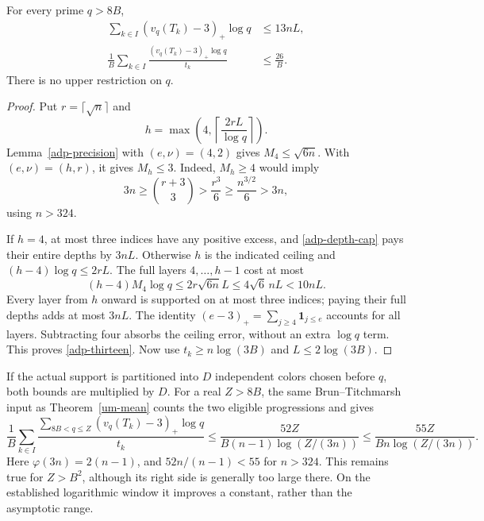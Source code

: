 \begin{theorem}\label{adp-prime}
For every prime \(q>8B\),
\begin{align}
 \sum_{k\in I}(v_q(T_k)-3)_+\log q&\leq13nL,
                    \label{adp-thirteen}\\
 \frac1B\sum_{k\in I}\frac{(v_q(T_k)-3)_+\log q}{t_k}
       &\leq\frac{26}{B}. \label{adp-twentysix}
\end{align}
There is no upper restriction on \(q\).
\end{theorem}
\begin{proof}
Put \(r=\lceil\sqrt n\rceil\) and
\[
 h=\max\left(4,\left\lceil\frac{2rL}{\log q}\right\rceil\right).
\]
Lemma~\ref{adp-precision} with \((e,\nu)=(4,2)\) gives
\(M_4\leq\sqrt{6n}\). With \((e,\nu)=(h,r)\), it gives \(M_h\leq3\).
Indeed, \(M_h\geq4\) would imply
\[
 3n\geq\binom{r+3}{3}>\frac{r^3}{6}
       \geq\frac{n^{3/2}}6>3n,
\]
using \(n>324\).

If \(h=4\), at most three indices have any positive excess, and
\eqref{adp-depth-cap} pays their entire depths by \(3nL\).
Otherwise \(h\) is the indicated ceiling and
\((h-4)\log q\leq2rL\). The full layers \(4,\ldots,h-1\) cost at most
\[
 (h-4)M_4\log q\leq2r\sqrt{6n}L
       \leq4\sqrt6\,nL<10nL.
\]
Every layer from \(h\) onward is supported on at most three indices;
paying their full depths adds at most \(3nL\). The identity
\((e-3)_+=\sum_{j\geq4}\mathbf1_{j\leq e}\) accounts for all layers.
Subtracting four absorbs the ceiling error, without an extra
\(\log q\) term. This proves \eqref{adp-thirteen}.
Now use \(t_k\geq n\log(3B)\) and \(L\leq2\log(3B)\).
\end{proof}

If the actual support is partitioned into \(D\) independent colors
chosen before \(q\), both bounds are multiplied by \(D\).
For a real \(Z>8B\), the same Brun--Titchmarsh input as
Theorem~\ref{um-mean} counts the two eligible progressions and gives
\begin{equation}\label{adp-window}
 \frac1B\sum_{k\in I}
  \frac{\sum_{8B<q\leq Z}(v_q(T_k)-3)_+\log q}{t_k}
 \leq\frac{52Z}{B(n-1)\log(Z/(3n))}
 \leq\frac{55Z}{Bn\log(Z/(3n))}.
\end{equation}
Here \(\varphi(3n)=2(n-1)\), and \(52n/(n-1)<55\) for \(n>324\).
This remains true for \(Z>B^2\), although its right side is generally
too large there. On the established logarithmic window it improves
a constant, rather than the asymptotic range.

